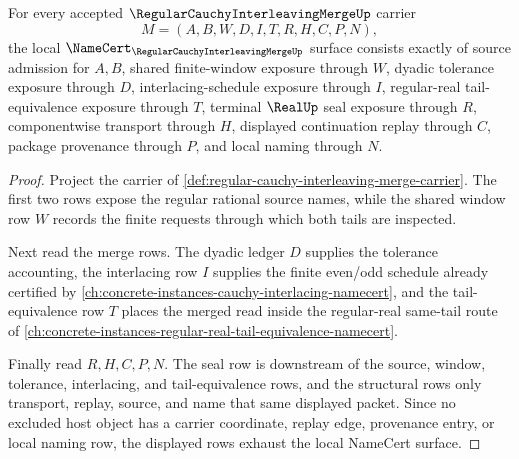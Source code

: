 \begin{theorem}
\label{thm:regular-cauchy-interleaving-merge-namecert-obligations}
For every accepted $\RegularCauchyInterleavingMergeUp$ carrier
$$
M=(A,B,W,D,I,T,R,H,C,P,N),
$$
the local $\NameCert_{\RegularCauchyInterleavingMergeUp}$ surface consists exactly of source admission for $A,B$, shared finite-window exposure through $W$, dyadic tolerance exposure through $D$, interlacing-schedule exposure through $I$, regular-real tail-equivalence exposure through $T$, terminal $\RealUp$ seal exposure through $R$, componentwise transport through $H$, displayed continuation replay through $C$, package provenance through $P$, and local naming through $N$.
\end{theorem}
\begin{proof}
Project the carrier of \autoref{def:regular-cauchy-interleaving-merge-carrier}. The first two rows expose the regular rational source names, while the shared window row $W$ records the finite requests through which both tails are inspected.

Next read the merge rows. The dyadic ledger $D$ supplies the tolerance accounting, the interlacing row $I$ supplies the finite even/odd schedule already certified by \autoref{ch:concrete-instances-cauchy-interlacing-namecert}, and the tail-equivalence row $T$ places the merged read inside the regular-real same-tail route of \autoref{ch:concrete-instances-regular-real-tail-equivalence-namecert}.

Finally read $R,H,C,P,N$. The seal row is downstream of the source, window, tolerance, interlacing, and tail-equivalence rows, and the structural rows only transport, replay, source, and name that same displayed packet. Since no excluded host object has a carrier coordinate, replay edge, provenance entry, or local naming row, the displayed rows exhaust the local NameCert surface.
\end{proof}

